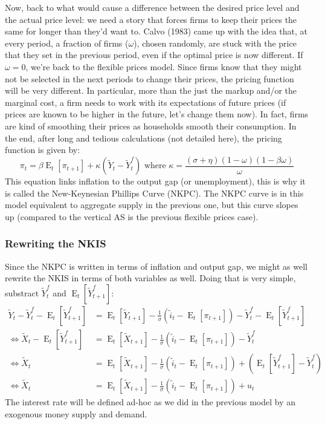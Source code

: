 \documentclass[12pt]{report}
\newcommand{\Et}[1]{\operatorname{E}_t\left[#1\right]}
\begin{document}
Now, back to what would cause a difference between the desired price level and the actual price level: we need a story that forces firms to keep their prices the same for longer than they'd want to. Calvo (1983) came up with the idea that, at every period, a fraction of firms ($\omega$), chosen randomly, are stuck with the price that they set in the previous period, even if the optimal price is now different. If $\omega = 0$, we're back to the flexible prices model. Since firms know that they might not be selected in the next periods to change their prices, the pricing function will be very different. In particular, more than the just the markup and/or the marginal cost, a firm needs to work with its expectations of future prices (if prices are known to be higher in the future, let's change them now). In fact, firms are kind of smoothing their prices as households smooth their consumption. In the end, after long and tedious calculations (not detailed here), the pricing function is given by: $$\pi_t = \beta\Et{\pi_{t+1}} + \kappa (\tilde Y_t - \tilde Y_t^f) \text{ where } \kappa = \frac{(\sigma + \eta)(1 - \omega)(1-\beta\omega)}{\omega} $$ This equation links inflation to the output gap (or unemployment), this is why it is called the New-Keynesian Phillips Curve (NKPC). The NKPC curve is in this model equivalent to aggregate supply in the previous one, but this curve slopes up (compared to the vertical AS is the previous flexible prices case).

\subsubsection{Rewriting the NKIS}

Since the NKPC is written in terms of inflation and output gap, we might as well rewrite the NKIS in terms of both variables as well. Doing that is very simple, substract $\tilde Y_t^f$ and $\Et{\tilde Y_{t+1}^f}$: \begin{align*}
\tilde Y_t - \tilde Y_t^f - \Et{\tilde Y_{t+1}^f} & = \Et{\tilde Y_{t+1}} - \frac{1}{\sigma}\left(\tilde i_t - \Et{\pi_{t+1}}\right) - \tilde Y_t^f - \Et{\tilde Y_{t+1}^f} \\ \Leftrightarrow \tilde X_t - \Et{\tilde Y_{t+1}^f} & = \Et{\tilde X_{t+1}} - \frac{1}{\sigma}\left(\tilde i_t - \Et{\pi_{t+1}}\right) - \tilde Y_t^f \\
\Leftrightarrow \tilde X_t & = \Et{\tilde X_{t+1}} - \frac{1}{\sigma}\left(\tilde i_t - \Et{\pi_{t+1}}\right) + \left(\Et{\tilde Y_{t+1}^f} - \tilde Y_t^f\right)\\
\Leftrightarrow \tilde X_t & = \Et{\tilde X_{t+1}} - \frac{1}{\sigma}\left(\tilde i_t - \Et{\pi_{t+1}}\right) + u_t
\end{align*}
The interest rate will be defined ad-hoc as we did in the previous model by an exogenous money supply and demand.
\end{document}

